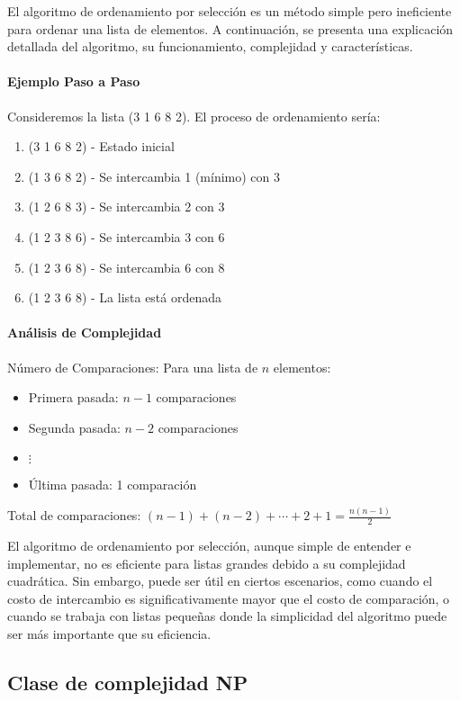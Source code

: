 \documentclass[12pt,titlepage,twoside,openright]{book}
\begin{document}
El algoritmo de ordenamiento por selección es un método simple pero ineficiente para ordenar una lista de elementos. A continuación, se presenta una explicación detallada del algoritmo, su funcionamiento, complejidad y características.

\paragraph{Ejemplo Paso a Paso}
Consideremos la lista (3 1 6 8 2). El proceso de ordenamiento sería:

\begin{enumerate}
    \item (3 1 6 8 2) - Estado inicial
    \item (1 3 6 8 2) - Se intercambia 1 (mínimo) con 3
    \item (1 2 6 8 3) - Se intercambia 2 con 3
    \item (1 2 3 8 6) - Se intercambia 3 con 6
    \item (1 2 3 6 8) - Se intercambia 6 con 8
    \item (1 2 3 6 8) - La lista está ordenada
\end{enumerate}

\paragraph{Análisis de Complejidad}
Número de Comparaciones:
Para una lista de $n$ elementos:
\begin{itemize}
    \item Primera pasada: $n-1$ comparaciones
    \item Segunda pasada: $n-2$ comparaciones
    \item $\vdots$
    \item Última pasada: 1 comparación
\end{itemize}
Total de comparaciones: $(n-1) + (n-2) + \cdots + 2 + 1 = \frac{n(n-1)}{2}$

El algoritmo de ordenamiento por selección, aunque simple de entender e implementar, no es eficiente para listas grandes debido a su complejidad cuadrática. Sin embargo, puede ser útil en ciertos escenarios, como cuando el costo de intercambio es significativamente mayor que el costo de comparación, o cuando se trabaja con listas pequeñas donde la simplicidad del algoritmo puede ser más importante que su eficiencia.

\subsection{Clase de complejidad NP}
\end{document}
